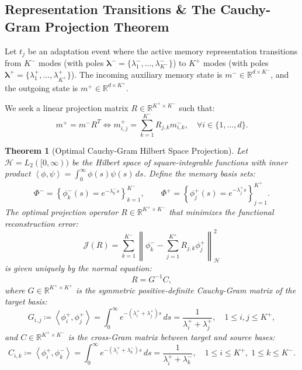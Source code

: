 \documentclass[11pt,a4paper]{article}
\theoremstyle{plain}
\newtheorem{theorem}{Theorem}[section]
\theoremstyle{definition}
\newcommand{\R}{\mathbb{R}}
\newcommand{\inner}[2]{\left\langle #1, #2 \right\rangle}
\newcommand{\norm}[1]{\left\| #1 \right\|}
\begin{document}
\subsection{Representation Transitions \& The Cauchy-Gram Projection Theorem}
\label{subsec:projection_theorem}

Let $t_j$ be an adaptation event where the active memory representation transitions from $K^-$ modes (with poles $\bm{\lambda}^- = \{\lambda_1^-, \dots, \lambda_{K^-}^-\}$) to $K^+$ modes (with poles $\bm{\lambda}^+ = \{\lambda_1^+, \dots, \lambda_{K^+}^+\}$). The incoming auxiliary memory state is $m^- \in \R^{d \times K^-}$, and the outgoing state is $m^+ \in \R^{d \times K^+}$.

We seek a linear projection matrix $R \in \R^{K^+ \times K^-}$ such that:
\begin{equation}
    m^+ = m^- R^T \iff m_{i, j}^+ = \sum_{k=1}^{K^-} R_{j, k} m_{i, k}^-, \quad \forall i \in \{1, \dots, d\}.
    \label{eq:forward_state_transition}
\end{equation}

\begin{theorem}[Optimal Cauchy-Gram Hilbert Space Projection]
\label{thm:optimal_projection}
Let $\mathcal{H} = L_2([0, \infty))$ be the Hilbert space of square-integrable functions with inner product $\inner{\phi}{\psi} = \int_0^\infty \phi(s) \psi(s) \, ds$. Define the memory basis sets:
\begin{equation}
    \Phi^- = \left\{ \phi_k^-(s) = e^{-\lambda_k^- s} \right\}_{k=1}^{K^-}, \qquad \Phi^+ = \left\{ \phi_j^+(s) = e^{-\lambda_j^+ s} \right\}_{j=1}^{K^+}.
\end{equation}
The optimal projection operator $R \in \R^{K^+ \times K^-}$ that minimizes the functional reconstruction error:
\begin{equation}
    \mathcal{J}(R) = \sum_{k=1}^{K^-} \norm{ \phi_k^- - \sum_{j=1}^{K^+} R_{j, k} \phi_j^+ }_{\mathcal{H}}^2
\end{equation}
is given uniquely by the normal equation:
\begin{equation}
    R = G^{-1} C,
    \label{eq:cauchy_gram_R}
\end{equation}
where $G \in \R^{K^+ \times K^+}$ is the symmetric positive-definite Cauchy-Gram matrix of the target basis:
\begin{equation}
    G_{i, j} \coloneqq \inner{\phi_i^+}{\phi_j^+} = \int_0^\infty e^{-(\lambda_i^+ + \lambda_j^+) s} \, ds = \frac{1}{\lambda_i^+ + \lambda_j^+}, \quad 1 \le i, j \le K^+,
    \label{eq:cauchy_gram_G}
\end{equation}
and $C \in \R^{K^+ \times K^-}$ is the cross-Gram matrix between target and source bases:
\begin{equation}
    C_{i, k} \coloneqq \inner{\phi_i^+}{\phi_k^-} = \int_0^\infty e^{-(\lambda_i^+ + \lambda_k^-) s} \, ds = \frac{1}{\lambda_i^+ + \lambda_k^-}, \quad 1 \le i \le K^+, \; 1 \le k \le K^-.
    \label{eq:cross_gram_C}
\end{equation}
\end{theorem}
\end{document}
